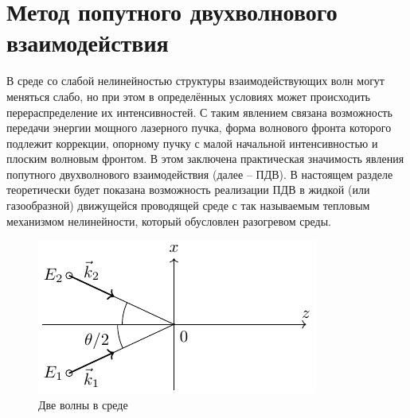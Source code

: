


\section{Метод попутного двухволнового взаимодействия}
В среде со слабой нелинейностью структуры взаимодействующих волн могут меняться слабо, но при этом в определённых условиях может происходить перераспределение их интенсивностей. С таким явлением связана возможность передачи энергии мощного лазерного пучка, форма волнового фронта которого подлежит коррекции, опорному пучку с малой начальной интенсивностью и плоским волновым фронтом. В этом заключена практическая значимость явления попутного двухволнового взаимодействия (далее -- ПДВ). В настоящем разделе теоретически будет показана возможность реализации ПДВ в жидкой (или газообразной) движущейся проводящей среде с так называемым тепловым механизмом нелинейности, который обусловлен разогревом среды.

\begin{figure}[ht]
	\centering
	\includegraphics[scale=1.5]{fig/fig1.pdf}
	\caption{Две волны в среде}
	\label{fig:figure1}
\end{figure}

